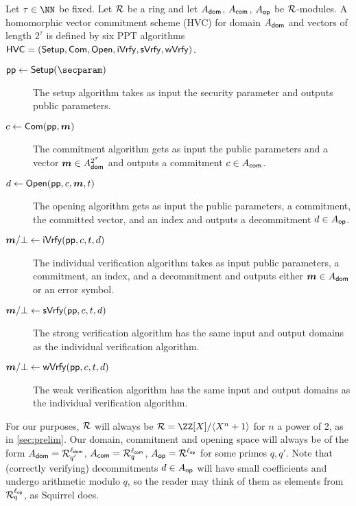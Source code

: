 \begin{definition}\label{def:hvc}
Let $\tau\in\NN$ be fixed.
  Let $\mathcal{R}$ be a ring and let $A_{\mathsf{dom}}$, $A_{\mathsf{com}}$, $A_{\mathsf{op}}$ be $\mathcal{R}$-modules. %
  A homomorphic vector commitment scheme (HVC) for domain $A_{\mathsf{dom}}$ and vectors of length $2^\tau$ is defined by six PPT algorithms $\mathsf{HVC}=(\mathsf{Setup},\mathsf{Com},\allowbreak\mathsf{Open},\mathsf{iVrfy},\mathsf{sVrfy}, \mathsf{wVrfy})$.
\begin{description}
    \item[$\params\gets\setup(\secparam)$] The setup algorithm takes as input the security parameter and outputs public parameters.
    \item[$c \gets \mathsf{Com}(\mathsf{pp},\boldsymbol{m})$] The commitment algorithm gets as input the public parameters and a vector $\boldsymbol{m}\in A_{\mathsf{dom}}^{2^\tau}$ and outputs a commitment $c\in A_{\mathsf{com}}$.
    \item[$d \gets \mathsf{Open}(\mathsf{pp},c,\boldsymbol{m},t)$] The opening algorithm gets as input the public parameters, a commitment, the committed vector, and an index and outputs a decommitment $d\in A_{\mathsf{op}}$.
    \item[$\boldsymbol{m}/\bot\gets \mathsf{iVrfy}(\mathsf{pp},c,t,d)$] The individual verification algorithm takes as input public parameters, a commitment, an index, and a decommitment and outputs either $\boldsymbol{m}\in A_{\mathsf{dom}}$ or an error symbol.
    \item[$\boldsymbol{m}/\bot\gets \mathsf{sVrfy}(\mathsf{pp},c,t,d)$] The strong verification algorithm has the same input and output domains as the individual verification algorithm.
    \item[$\boldsymbol{m}/\bot\gets \mathsf{wVrfy}(\mathsf{pp},c,t,d)$] The weak verification algorithm has the same input and output domains as the individual verification algorithm.
  \end{description}
\end{definition}
For our purposes, $\mathcal{R}$ will always be $\ring = \defring$ for $n$ a power of 2, as in \autoref{sec:prelim}.
Our domain, commitment and opening space will always be of the form $A_{\mathsf{dom}} = \mathcal{R}_{q'}^{\ell_{\mathsf{dom}}}$, $A_{\mathsf{com}} = \mathcal{R}_q^{\ell_{\mathsf{com}}}$, $A_{\mathsf{op}} = \mathcal{R}^{\ell_{\mathsf{op}}}$ for some primes $q,q'$.
Note that (correctly verifying) decommitments $d\in A_{\mathsf{op}}$ will have small coefficients and undergo arithmetic modulo $q$, so the reader may think of them as elements from $\mathcal{R}_q^{\ell_{\mathsf{op}}}$, as Squirrel \cite{CCS:FleSimZha22} does.

